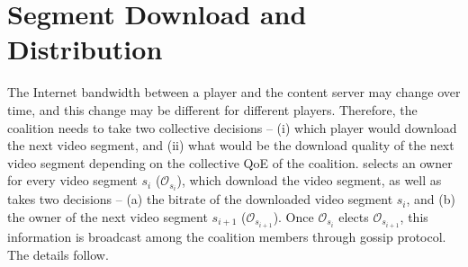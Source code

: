 \section{Segment Download and Distribution}
The Internet bandwidth between a player and the content server may change over time, and this change may be different for different {\our} players. Therefore, the coalition needs to take two collective decisions -- (i) which player would download the next video segment, and (ii) what would be the download quality of the next video segment depending on the collective QoE of the coalition. {\our} selects an owner for every video segment $s_i$ ($\mathcal{O}_{s_i}$), which download the video segment, as well as takes two decisions -- (a) the bitrate of the downloaded video segment $s_i$, and (b) the owner of the next video segment $s_{i+1}$ ($\mathcal{O}_{s_{i+1}}$). Once $\mathcal{O}_{s_i}$ elects $\mathcal{O}_{s_{i+1}}$, this information is broadcast among the coalition members through gossip protocol. The details follow. 
